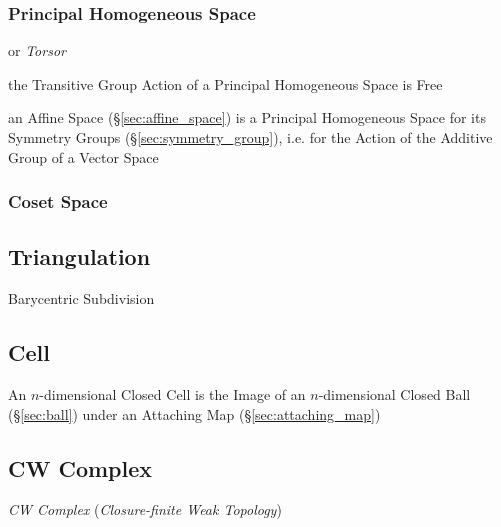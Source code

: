 \subsubsection{Principal Homogeneous Space}
\label{sec:principal_homogeneous_space}

or \emph{Torsor}

the Transitive Group Action of a Principal Homogeneous Space is Free

an Affine Space (\S\ref{sec:affine_space}) is a Principal Homogeneous Space for
its Symmetry Groups (\S\ref{sec:symmetry_group}), i.e. for the Action of the
Additive Group of a Vector Space



\subsubsection{Coset Space}\label{sec:coset_space}



\subsection{Triangulation}\label{sec:triangulation}

Barycentric Subdivision



\subsection{Cell}\label{sec:topology_cell}

An $n$-dimensional Closed Cell is the Image of an $n$-dimensional
Closed Ball (\S\ref{sec:ball}) under an Attaching Map
(\S\ref{sec:attaching_map})



\subsection{CW Complex}\label{sec:cw_complex}

\emph{CW Complex} (\emph{Closure-finite Weak Topology})

